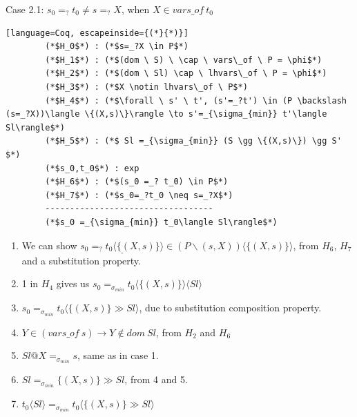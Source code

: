 \documentclass[10pt]{beamer}
\begin{document}
\begin{frame}[fragile]{}
	\begin{block}{Case 2.1: $s_0 =_? t_0 \neq s =_?X$, when $X \in vars\_of \ t_0$}
	\begin{lstlisting}[language=Coq, escapeinside={(*}{*)}]
		(*$H_0$*) : (*$s=_?X \in P$*)
		(*$H_1$*) : (*$(dom \ S) \ \cap \ vars\_of \ P = \phi$*)
		(*$H_2$*) : (*$(dom \ Sl) \cap \ lhvars\_of \ P = \phi$*)
		(*$H_3$*) : (*$X \notin lhvars\_of \ P$*)
		(*$H_4$*) : (*$\forall \ s' \ t', (s'=_?t') \in (P \backslash (s=_?X))\langle \{(X,s)\}\rangle \to s'=_{\sigma_{min}} t'\langle Sl\rangle$*)
		(*$H_5$*) : (*$ Sl =_{\sigma_{min}} (S \gg \{(X,s)\}) \gg S' $*)
		(*$s_0,t_0$*) : exp
		(*$H_6$*) : (*$(s_0 =_? t_0) \in P$*)
		(*$H_7$*) : (*$s_0=_?t_0 \neq s=_?X$*)
		----------------------------------
		(*$s_0 =_{\sigma_{min}} t_0\langle Sl\rangle$*)
	\end{lstlisting}
	\end{block}
\begin{enumerate}
	\pause
	\item We can show $\underline{s_0=_?t_0\langle\{(X,s)\} \rangle} \in (P \backslash (s,X))\langle \{(X,s)\}\rangle $, from $H_6$, $H_7$ and a substitution property.
	\pause
	\item 1 in $H_4$ gives us $s_0 =_{\sigma_{min}} t_0\langle\{(X,s)\} \rangle\langle Sl\rangle$
	\pause
	\item $s_0 =_{\sigma_{min}} t_0\langle\{(X,s)\} \gg Sl\rangle$, due to substitution composition property.
	\item  $Y \in (vars\_of \ s) \to Y \notin dom \ Sl$, from $H_2$ and $H_6$
	\pause
	\item  $Sl @ X =_{\sigma_{min}} s$, same as in case 1.
	\pause 
	\item $Sl =_{\sigma_{min}} \{(X,s)\} \gg Sl$, from 4 and 5.
	\pause
	\item $t_0\langle Sl \rangle =_{\sigma_{min}} t_0\langle \{(X,s)\} \gg Sl\rangle$
\end{enumerate}
\end{frame}
\end{document}
